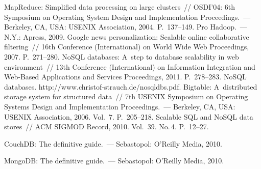 \begin{multicols}{2}
{\small\frenchspacing
{%
\begin{thebibliography}{9}

 MapReduce: Simplified data processing on large 
clusters~// OSDI'04:  6th Symposium on Operating System Design and 
Implementation Proceedings.~--- Berkeley, CA, USA: USENIX Association, 
2004. P.~137--149.
 Pro Hadoop.~--- N.Y.: Apress, 2009.
 Google news personalization: 
Scalable online collaborative filtering~// 16th Conference (International) on World 
Wide Web Proceedings, 2007. P.~271--280.
 NoSQL databases: A~step to database scalability in web 
environment~//  13th Conference (International) on Information Integration and 
Web-Based Applications and Services Proceedings, 2011. P.~278--283.
 NoSQL databases. {\sf http://www.christof-strauch.de/nosqldbs.pdf}.
 Bigtable: A~distributed 
storage system for structured data~//  7th USENIX Symposium on Operating 
Systems Design and Implementation Proceedings.~--- Berkeley, CA, USA: 
USENIX Association, 2006. Vol.~7. P.~205--218.
 Scalable SQL and NoSQL data stores~// ACM SIGMOD Record, 
2010. Vol.~39. No.\,4. P.~12--27.


 CouchDB: The definitive guide.~--- 
Sebastopol: O'Reilly Media, 2010.

\label{end\stat}


 MongoDB: The definitive guide.~--- Sebastopol: 
O'Reilly Media, 2010. 
\end{thebibliography}
} }

\end{multicols}
